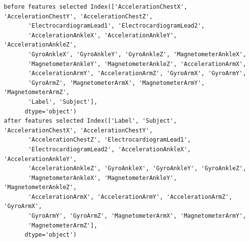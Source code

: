 \documentclass[11pt]{article}
\begin{document}
    \begin{Verbatim}[commandchars=\\\{\}]
before features selected Index(['AccelerationChestX', 'AccelerationChestY', 'AccelerationChestZ',
       'ElectrocardiogramLead1', 'ElectrocardiogramLead2',
       'AccelerationAnkleX', 'AccelerationAnkleY', 'AccelerationAnkleZ',
       'GyroAnkleX', 'GyroAnkleY', 'GyroAnkleZ', 'MagnetometerAnkleX',
       'MagnetometerAnkleY', 'MagnetometerAnkleZ', 'AccelerationArmX',
       'AccelerationArmY', 'AccelerationArmZ', 'GyroArmX', 'GyroArmY',
       'GyroArmZ', 'MagnetometerArmX', 'MagnetometerArmY', 'MagnetometerArmZ',
       'Label', 'Subject'],
      dtype='object')
after features selected Index(['Label', 'Subject', 'AccelerationChestX', 'AccelerationChestY',
       'AccelerationChestZ', 'ElectrocardiogramLead1',
       'ElectrocardiogramLead2', 'AccelerationAnkleX', 'AccelerationAnkleY',
       'AccelerationAnkleZ', 'GyroAnkleX', 'GyroAnkleY', 'GyroAnkleZ',
       'MagnetometerAnkleX', 'MagnetometerAnkleY', 'MagnetometerAnkleZ',
       'AccelerationArmX', 'AccelerationArmY', 'AccelerationArmZ', 'GyroArmX',
       'GyroArmY', 'GyroArmZ', 'MagnetometerArmX', 'MagnetometerArmY',
       'MagnetometerArmZ'],
      dtype='object')

    \end{Verbatim}
\end{document}
